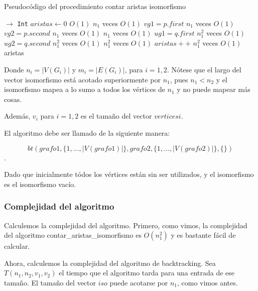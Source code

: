 \begin{algorithm}[H]
  \begin{algorithmic}[1]
  \caption{Pseudocódigo del procedimiento contar aristas isomorfismo}
  \label{algo:2-2}
     $\to$ \texttt{Int}
      \State $aristas \gets 0$
      \Comment $O(1)$
         \Comment $n_1$ veces $O(1)$ 
         \State $vg1 = p.first$
         \Comment $n_1$ veces $O(1)$ 
         \State $vg2 = p.second$
         \Comment $n_1$ veces $O(1)$ 
           \Comment $n_1$ veces $O(1)$
           \State $ug1 = q.first$
           \Comment $n_1^2$ veces $O(1)$
           \State $ug2 = q.second$
           \Comment $n_1^2$ veces $O(1)$
           \Comment $n_1^2$ veces $O(1)$
             \State $aristas++$
             \Comment $n_1^2$ veces $O(1)$
           \EndIf
         \EndFor
       \EndFor
     \Return aristas
		\EndProcedure
	\end{algorithmic}
\end{algorithm}

Donde $n_i = |V(G_i)|$ y $m_i = |E(G_i)|$, para $i = 1, 2$. Nótese que el largo del vector isomorfismo está acotado superiormente por $n_1$, pues $n_1 < n_2$ y el isomorfismo mapea a lo sumo a todos los vértices de $n_1$ y no puede mapear más cosas. 

Además, $v_i$ para $i = 1,2$ es el tamaño del vector $verticesi$.


El algoritmo debe ser llamado de la siguiente manera:

\[bt(grafo1, \{1,...,|V(grafo1)|\}, grafo2, \{1,...,|V(grafo2)|\}, \{ \})\].

Dado que inicialmente tódos los vértices están sin ser utilizados, y el isomorfismo es el isomorfismo vacío.

\subsubsection{Complejidad del algoritmo}

Calculemos la complejidad del algoritmo. Primero, como vimos, la complejidad del algoritmo contar\_aristas\_isomorfismo es $O(n_1^2)$ y es bastante fácil de calcular.

Ahora, calculemos la complejidad del algoritmo de backtracking. Sea $T(n_1, n_2, v_1, v_2)$ el tiempo que el algoritmo tarda para una entrada de ese tamaño. El tamaño del vector $iso$ puede acotarse por $n_1$, como vimos antes.

